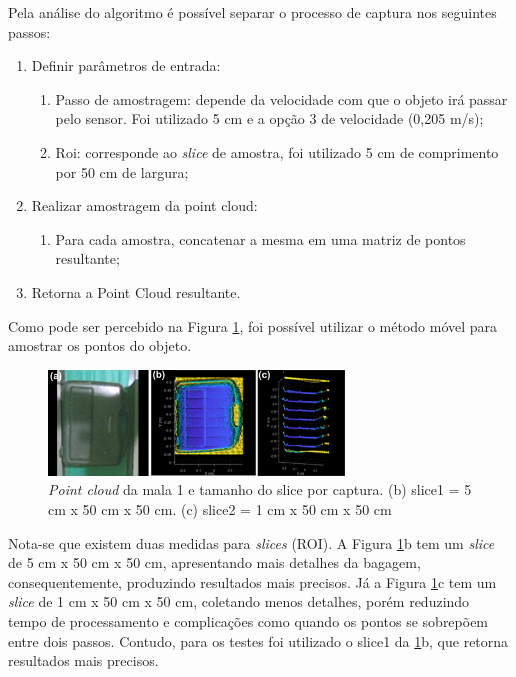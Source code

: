 


    Pela análise do algoritmo é possível separar o processo de captura nos seguintes passos:
    
    \begin{enumerate}
        \item Definir parâmetros de entrada:
        \begin{enumerate}
            \item Passo de amostragem: depende da velocidade com que o objeto irá passar pelo sensor. Foi utilizado 5 cm e a opção 3 de velocidade (0,205 m/s);
            \item Roi: corresponde ao \textit{slice} de amostra, foi utilizado 5 cm de comprimento por 50 cm de largura;
        \end{enumerate}
        \item Realizar amostragem da point cloud:
        \begin{enumerate}
            \item Para cada amostra, concatenar a mesma em uma matriz de pontos resultante;
        \end{enumerate}
        \item Retorna a Point Cloud resultante.
    \end{enumerate}

    Como pode ser percebido na Figura \ref{fig:pointCloudDaMala1_Roi1_Roi2}, foi possível utilizar o método móvel para amostrar os pontos do objeto. 

        \begin{figure}[h]
           \centering
           \includegraphics[width=0.7\textwidth]{imagens/pointCloudDaMala1_Roi1_Roi2_v2.png}
           \caption{\textit{Point cloud} da mala 1 e tamanho do slice por captura. (b) slice1 = 5 cm x 50 cm x 50 cm. (c) slice2 = 1 cm x 50 cm x 50 cm}
          \label{fig:pointCloudDaMala1_Roi1_Roi2}
        \end{figure}
    
    Nota-se que existem duas medidas para \textit{slices} (ROI). A Figura \ref{fig:pointCloudDaMala1_Roi1_Roi2}b tem um \textit{slice} de 5 cm x 50 cm x 50 cm, apresentando mais detalhes da bagagem, consequentemente, produzindo resultados mais precisos. Já a Figura \ref{fig:pointCloudDaMala1_Roi1_Roi2}c tem um \textit{slice} de 1 cm x 50 cm x 50 cm, coletando menos detalhes, porém reduzindo tempo de processamento e complicações como quando os pontos se sobrepõem entre dois passos. Contudo, para os testes foi utilizado o slice1 da  \ref{fig:pointCloudDaMala1_Roi1_Roi2}b, que retorna resultados mais precisos.
    
